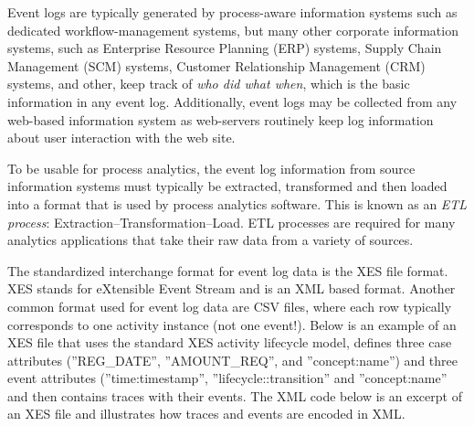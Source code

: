 Event logs are typically generated by process-aware information systems such as dedicated workflow-management systems, but many other corporate information systems, such as Enterprise Resource Planning (ERP) systems, Supply Chain Management (SCM) systems, Customer Relationship Management (CRM) systems, and other, keep track of \emph{who did what when}, which is the basic information in any event log. Additionally, event logs may be collected from any web-based information system as web-servers routinely keep log information about user interaction with the web site. 

To be usable for process analytics, the event log information from source information systems must typically be extracted, transformed and then loaded into a format that is used by process analytics software. This is known as an \emph{ETL process}: Extraction--Transformation--Load. ETL processes are required for many analytics applications that take their raw data from a variety of sources.

The standardized interchange format for event log data is the XES file format. XES stands for eXtensible Event Stream and is an XML based format. Another common format used for event log data are CSV files, where each row typically corresponds to one activity instance (not one event!). Below is an example of an XES file that uses the standard XES activity lifecycle model, defines three case attributes (''REG\_DATE'', ''AMOUNT\_REQ'', and ''concept:name'') and three event attributes (''time:timestamp'', ''lifecycle::transition'' and ''concept:name'' and then contains traces with their events. The XML code below is an excerpt of an XES file and illustrates how traces and events are encoded in XML.

